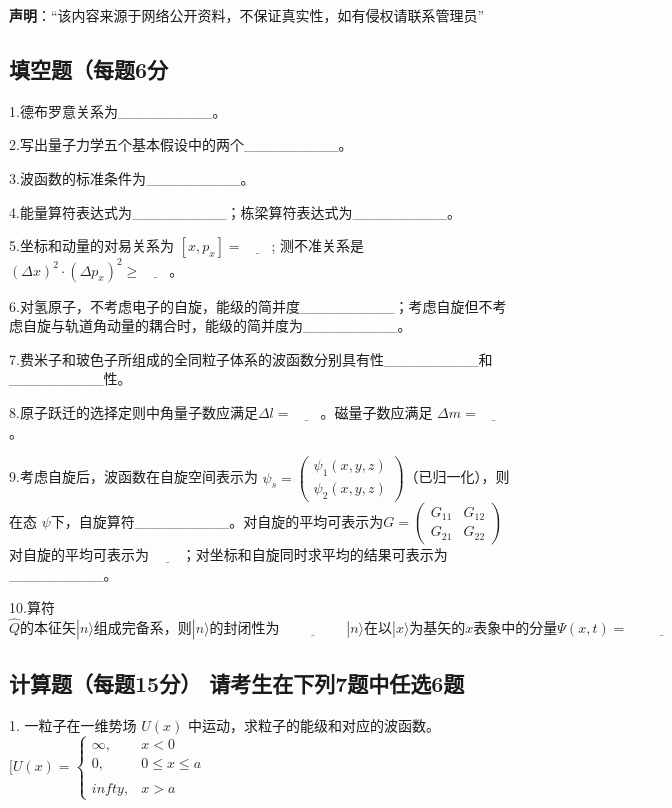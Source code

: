 
\textbf{声明}：“该内容来源于网络公开资料，不保证真实性，如有侵权请联系管理员”

\subsection{填空题（每题6分}

1.德布罗意关系为_________。

2.写出量子力学五个基本假设中的两个_________。

3.波函数的标准条件为_________。

4.能量算符表达式为_________；栋梁算符表达式为_________。

5.坐标和动量的对易关系为 $[x, p_x] = \underline{\quad\quad}$;
          测不准关系是 $(\Delta x)^2 \cdot (\Delta p_x)^2 \geq \underline{\quad\quad}$。

6.对氢原子，不考虑电子的自旋，能级的简并度_________；考虑自旋但不考虑自旋与轨道角动量的耦合时，能级的简并度为_________。

7.费米子和玻色子所组成的全同粒子体系的波函数分别具有性_________和_________性。

8.原子跃迁的选择定则中角量子数应满足$\Delta l = \underline{\quad\quad}$。磁量子数应满足 $\Delta m = \underline{\quad\quad}$。

9.考虑自旋后，波函数在自旋空间表示为 $\psi_s = \begin{pmatrix} \psi_1(x, y, z) \\ \psi_2(x, y, z) \end{pmatrix}$（已归一化），则在态 $\psi$下，自旋算符_________。对自旋的平均可表示为$G = \begin{pmatrix} G_{11} & G_{12} \\ G_{21} & G_{22} \end{pmatrix}$ 对自旋的平均可表示为 $\underline{\quad\quad}$；对坐标和自旋同时求平均的结果可表示为_________。

10.算符$\hat{Q}\text{的本征矢}|n\rangle \text{组成完备系，则}|n\rangle \text{的封闭性为} \underline{\hspace{2cm}}
|n\rangle \text{在以}|x\rangle \text{为基矢的} x \text{表象中的分量}\Psi(x,t)=\underline{\hspace{2cm}}$

\subsection{计算题（每题15分） 请考生在下列7题中任选6题}

1. 一粒子在一维势场 $U(x)$ 中运动，求粒子的能级和对应的波函数。
$[ U(x) = \begin{cases} \infty, & x < 0 \\0, & 0 \le x \le a \\\\infty, & x > a \end{cases}$
